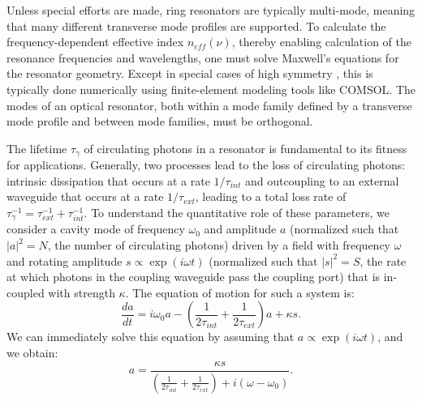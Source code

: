 	 Unless special efforts are made, ring resonators are typically multi-mode, meaning that many different transverse mode profiles are supported. To calculate the frequency-dependent effective index $n_{eff}(\nu)$, thereby enabling calculation of the resonance frequencies and wavelengths, one must solve Maxwell's equations for the resonator geometry. Except in special cases of high symmetry \cite{microsphereresonators}, this is typically done numerically using finite-element modeling tools like COMSOL. The modes of an optical resonator, both within a mode family defined by a transverse mode profile and between mode families, must be orthogonal. 

 The lifetime $\tau_\gamma$ of circulating photons in a resonator is fundamental to its fitness for applications. Generally, two processes lead to the loss of circulating photons: intrinsic dissipation that occurs at a rate $1/\tau_{int}$ and outcoupling to an external waveguide that occurs at a rate $1/\tau_{ext}$, leading to a total loss rate of $\tau_\gamma^{-1}=\tau_{ext}^{-1}+\tau_{int}^{-1}$. To understand the quantitative role of these parameters, we consider a cavity mode of frequency $\omega_0$ and amplitude $a$ (normalized such that $|a|^2=N$, the number of circulating photons) driven by a field with frequency $\omega$ and rotating amplitude $s\propto\exp(i\omega t)$ (normalized such that $|s|^2=S$, the rate at which photons in the coupling waveguide pass the coupling port) that is in-coupled with strength $\kappa$. The equation of motion for such a system is\cite{Haus1984}:
 \begin{equation}
 \frac{d a}{d t}=i\omega_0 a-\left(\frac{1}{2\tau_{int}}+\frac{1}{2\tau_{ext}}\right)a+\kappa s. \label{eq:coupledmotion}
 \end{equation}
 We can immediately solve this equation by assuming that $a\propto\exp(i\omega t)$, and we obtain:
 \begin{equation}
 a=\frac{\kappa s}{\left(\frac{1}{2\tau_{int}}+\frac{1}{2\tau_{ext}}\right)+i(\omega-\omega_0)}. \label{eq:coupledsoln}
 \end{equation}
 
